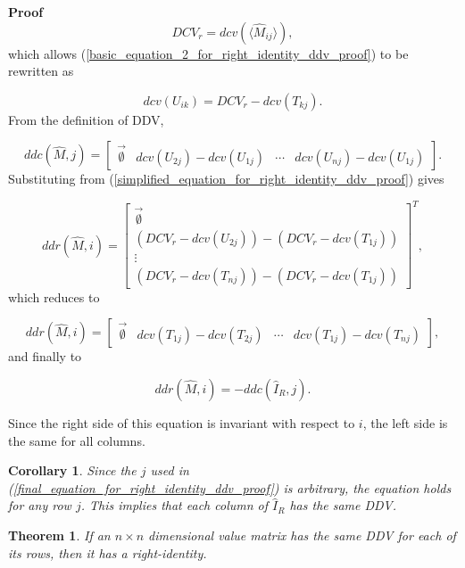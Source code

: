 \documentclass[10pt,letterpaper]{article}
\newtheorem{thm}{Theorem}[section]
\newtheorem{cor}{Corollary}[section]
\newenvironment{proof}{\noindent\textbf{Proof} }{\qed \newline}
\newcommand{\qed}{\nobreak \ifvmode \relax \else
      \ifdim\lastskip<1.5em \hskip-\lastskip
      \hskip1.5em plus0em minus0.5em \fi \nobreak
      \vrule height0.75em width0.5em depth0.25em\fi}
\numberwithin{equation}{section}
\begin{document}
\begin{proof}
\[ DCV_r = dcv( \langle \hat M_{ij} \rangle ) , \] which allows
(\ref{basic_equation_2_for_right_identity_ddv_proof}) to be rewritten
as

\begin{equation} \label{simplified_equation_for_right_identity_ddv_proof}
  dcv(U_{ik}) = DCV_r - dcv(T_{kj}) . \end{equation} From the
definition of DDV,

\[ ddc(\hat M, j) = \left[ \begin{matrix} \vec{\emptyset} &
    dcv(U_{2j}) - dcv(U_{1j}) & \cdots & dcv(U_{nj}) -
    dcv(U_{1j}) \end{matrix} \right] . \] Substituting from
(\ref{simplified_equation_for_right_identity_ddv_proof}) gives

\[ ddr(\hat M, i) = \left[ \begin{matrix} \vec{\emptyset} \\ (DCV_r -
    dcv(U_{2j})) - (DCV_r - dcv(T_{1j})) \\ \vdots \\ (DCV_r -
    dcv(T_{nj})) - (DCV_r - dcv(T_{1j})) \end{matrix} \right] ^T , \]
which reduces to

\[ ddr(\hat M, i) = \left[ \begin{matrix} \vec{\emptyset} &
    dcv(T_{1j}) - dcv(T_{2j}) & \cdots & dcv(T_{1j}) -
    dcv(T_{nj}) \end{matrix} \right] , \] and finally to

\begin{equation} \label{final_equation_for_right_identity_ddv_proof}
  ddr(\hat M, i) = -ddc(\hat I_R, j) . \end{equation}

Since the right side of this equation is invariant with respect to
$i$, the left side is the same for all columns. \end{proof}

\begin{cor}Since the $j$ used in
  (\ref{final_equation_for_right_identity_ddv_proof}) is arbitrary,
  the equation holds for any row $j$.  This implies that each column
  of $\hat I_R$ has the same DDV.\end{cor}

\begin{thm} \label{if_same_row_ddvs_then_IR} If an $n \times n$
  dimensional value matrix has the same DDV for each of its rows, then
  it has a right-identity.\end{thm}
\end{document}
